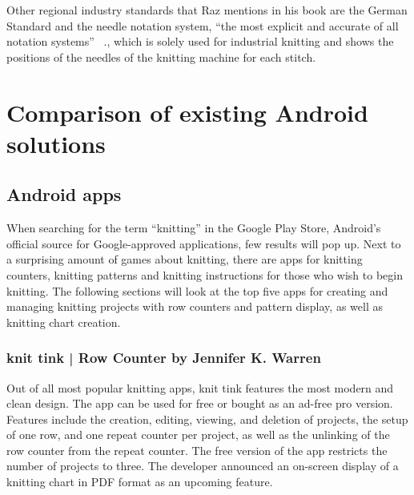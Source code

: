 Other regional industry standards that Raz mentions in his book are the German Standard and the needle notation system, ``the most explicit and accurate of all  notation systems'' ~\cite[p58]{Raz1993}., which is solely used for industrial knitting and shows the positions of the needles of the knitting machine for each stitch.

\section{Comparison of existing Android solutions}

\subsection{Android apps}
When searching for the term ``knitting'' in the Google Play Store, Android’s official source for Google-approved applications, few results will pop up. Next to a surprising amount of games about knitting, there are apps for knitting counters, knitting patterns and knitting instructions for those who wish to begin knitting. The following sections will look at the top five apps for creating and managing knitting projects with row counters and pattern display, as well as knitting chart creation.

\subsubsection*{knit tink | Row Counter by Jennifer K. Warren}
Out of all most popular knitting apps, knit tink features the most modern and clean design. The app can be used for free or bought as an ad-free pro version. Features include the creation, editing, viewing, and deletion of projects, the setup of one row, and one repeat counter per project, as well as the unlinking of the row counter from the repeat counter. The free version of the app restricts the number of projects to three. The developer announced an on-screen display of a knitting chart in PDF format as an upcoming feature.


